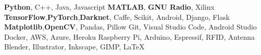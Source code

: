 %
%
%


\begin{keywords}
		 {\textbf {Python}, C++, Java, Javascript}
		 {\textbf {MATLAB}, \textbf {GNU Radio}, Xilinx}
         {\textbf {TensorFlow},\textbf {PyTorch},\textbf {Darknet}, Caffe, Scikit, Android, Django, Flask}
         {\textbf {Matplotlib},\textbf {OpenCV}, Pandas, Pillow}
         {Git, Visual Studio Code, Android Studio Docker, AWS, Azure, Heroku}
         {Raspberry Pi, Arduino,  Espressif, RFID, Antenna}
         {Blender, Illustrator, Inkscape, GIMP, LaTeX}
\end{keywords}